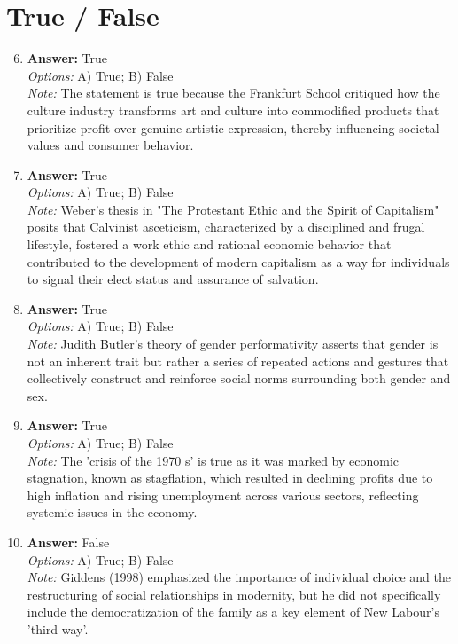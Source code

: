 \documentclass[12pt]{article}
\begin{document}
\section*{True / False}
\begin{enumerate}[label=\arabic*.]
\setcounter{enumi}{5}
\item \textbf{Answer:} True
\\ \textit{Options:} A) True; B) False
\\ \textit{Note:} The statement is true because the Frankfurt School critiqued how the culture industry transforms art and culture into commodified products that prioritize profit over genuine artistic expression, thereby influencing societal values and consumer behavior.
\item \textbf{Answer:} True
\\ \textit{Options:} A) True; B) False
\\ \textit{Note:} Weber's thesis in "The Protestant Ethic and the Spirit of Capitalism" posits that Calvinist asceticism, characterized by a disciplined and frugal lifestyle, fostered a work ethic and rational economic behavior that contributed to the development of modern capitalism as a way for individuals to signal their elect status and assurance of salvation.
\item \textbf{Answer:} True
\\ \textit{Options:} A) True; B) False
\\ \textit{Note:} Judith Butler's theory of gender performativity asserts that gender is not an inherent trait but rather a series of repeated actions and gestures that collectively construct and reinforce social norms surrounding both gender and sex.
\item \textbf{Answer:} True
\\ \textit{Options:} A) True; B) False
\\ \textit{Note:} The 'crisis of the 1970 s' is true as it was marked by economic stagnation, known as stagflation, which resulted in declining profits due to high inflation and rising unemployment across various sectors, reflecting systemic issues in the economy.
\item \textbf{Answer:} False
\\ \textit{Options:} A) True; B) False
\\ \textit{Note:} Giddens (1998) emphasized the importance of individual choice and the restructuring of social relationships in modernity, but he did not specifically include the democratization of the family as a key element of New Labour's 'third way'.
\end{enumerate}
\end{document}
